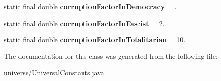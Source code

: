 \begin{DoxyCompactItemize}
\item 
static final double {\bfseries corruption\+Factor\+In\+Democracy} = .\hypertarget{classuniverse_1_1_universal_constants_ab46dca23fa971c64753da81a41eceb54}{}\label{classuniverse_1_1_universal_constants_ab46dca23fa971c64753da81a41eceb54}

\item 
static final double {\bfseries corruption\+Factor\+In\+Fascist} = 2.\hypertarget{classuniverse_1_1_universal_constants_a15bf82ffb7a61bb8ec0d2a56eb1676f2}{}\label{classuniverse_1_1_universal_constants_a15bf82ffb7a61bb8ec0d2a56eb1676f2}

\item 
static final double {\bfseries corruption\+Factor\+In\+Totalitarian} = 10.\hypertarget{classuniverse_1_1_universal_constants_aa6c0e7ed662f703079df46d921c8b4cc}{}\label{classuniverse_1_1_universal_constants_aa6c0e7ed662f703079df46d921c8b4cc}

\end{DoxyCompactItemize}


The documentation for this class was generated from the following file\+:\begin{DoxyCompactItemize}
\item 
universe/Universal\+Constants.\+java\end{DoxyCompactItemize}
